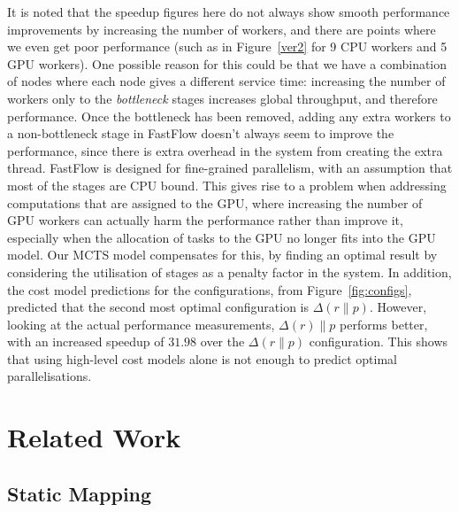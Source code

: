 \documentclass[smallextended]{svjour3}
\begin{document}
It is noted that the speedup figures here do not always show smooth performance improvements by increasing the number of workers, and there are points where we even get poor performance (such as in Figure~\ref{ver2} for 9 CPU workers and 5 GPU workers).
One possible reason for this could be that we have a combination of nodes where each node
gives a different service time: increasing the number of workers only to the \emph{bottleneck} stages
increases global throughput, and therefore performance.
Once the bottleneck has been removed, adding any extra workers to a 
non-bottleneck stage in FastFlow doesn't always seem to improve the performance, since there is extra overhead in the system from creating the extra thread. FastFlow is designed for fine-grained parallelism, with an assumption
that most of the stages are CPU bound. 
This gives rise to a problem when addressing computations that are assigned to the GPU, where increasing the number of GPU workers can
actually harm the performance rather than improve it, especially when the allocation of tasks to the GPU no longer fits into the GPU model.
Our MCTS model compensates for this, by finding an optimal result by considering the utilisation of stages as a penalty factor in the system.
In addition, the cost model predictions for the configurations, from Figure~\ref{fig:configs}, predicted that the second most optimal configuration is $\Delta(r  \parallel p)$. However, looking at the actual performance measurements, $ \Delta(r) \parallel p $ performs better, with an increased speedup of $31.98$ over the $\Delta(r \parallel p)$ configuration. This shows that using high-level cost models alone is not enough to predict optimal parallelisations.

\section{Related Work}
\subsection{Static Mapping}
\end{document}
